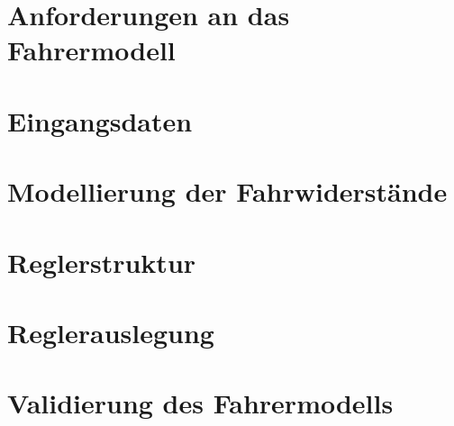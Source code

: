 
\section{Anforderungen an das Fahrermodell}

\section{Eingangsdaten}

\section{Modellierung der Fahrwiderstände}

\section{Reglerstruktur}

\section{Reglerauslegung}

\section{Validierung des Fahrermodells}
